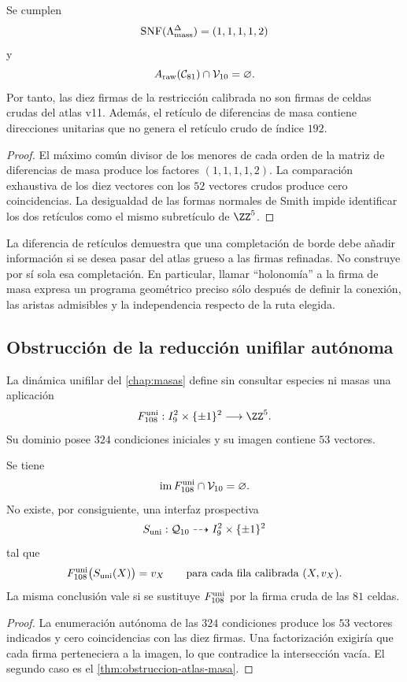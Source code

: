\begin{theorem}
\label{thm:obstruccion-atlas-masa}
Se cumplen
\[
 \operatorname{SNF}(\Lambda_{\rm mass}^{\Delta})=(1,1,1,1,2)
\]
y
\[
 A_{\rm raw}(\mathcal C_{81})
 \cap \mathcal V_{10}=\varnothing.
\]
Por tanto, las diez firmas de la restricción calibrada no son firmas de celdas crudas del
atlas v11. Además, el retículo de diferencias de masa contiene direcciones
unitarias que no genera el retículo crudo de índice \(192\).
\end{theorem}
\begin{proof}
El máximo común divisor de los menores de cada orden de la matriz de
diferencias de masa produce los factores \((1,1,1,1,2)\). La comparación
exhaustiva de los diez vectores con los \(52\) vectores crudos produce cero
coincidencias. La desigualdad de las formas normales de Smith impide
identificar los dos retículos como el mismo subretículo de \(\ZZ^5\).
\end{proof}

La diferencia de retículos demuestra que una completación de borde debe
añadir información si se desea pasar del atlas grueso a las firmas refinadas.
No construye por sí sola esa completación. En particular, llamar ``holonomía''
a la firma de masa expresa un programa geométrico preciso sólo después de
definir la conexión, las aristas admisibles y la independencia respecto de la
ruta elegida.

\subsection{Obstrucción de la reducción unifilar autónoma}

La dinámica unifilar del \cref{chap:masas} define sin consultar especies ni
masas una aplicación
\[
 F_{108}^{\rm uni}:I_9^2\times\{\pm1\}^2\longrightarrow\ZZ^5.
\]
Su dominio posee \(324\) condiciones iniciales y su imagen contiene \(53\)
vectores.

\begin{corollary}
\label{cor:no-factorizacion-atlas}
Se tiene
\[
 \operatorname{im}F_{108}^{\rm uni}
 \cap\mathcal V_{10}=\varnothing.
\]
No existe, por consiguiente, una interfaz prospectiva
\[
 S_{\rm uni}:\mathcal Q_{10}
 \dashrightarrow
 I_9^2\times\{\pm1\}^2
\]
tal que
\[
 F_{108}^{\rm uni}\bigl(S_{\rm uni}(X)\bigr)=v_X
 \qquad\text{para cada fila calibrada }(X,v_X).
\]
La misma conclusión vale si se sustituye \(F_{108}^{\rm uni}\) por la firma
cruda de las \(81\) celdas.
\end{corollary}
\begin{proof}
La enumeración autónoma de las \(324\) condiciones produce los \(53\)
vectores indicados y cero coincidencias con las diez firmas. Una
factorización exigiría que cada firma perteneciera a la imagen, lo que
contradice la intersección vacía. El segundo caso es el
\cref{thm:obstruccion-atlas-masa}.
\end{proof}

